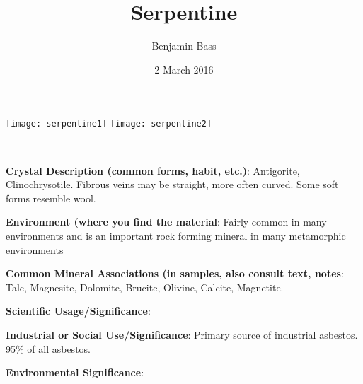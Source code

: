\documentclass[10pt]{article}
\author{Benjamin Bass}
\date{2 March 2016}
\title{\vspace{-2.0cm}Serpentine} %
\begin{document}
\maketitle


\begin{center}
  \texttt{[image: serpentine1]}
  \texttt{[image: serpentine2]}
\end{center}



\
\
\
\
\
\
\
\
\
\

\begin{framed}
  \textbf{Crystal Description (common forms, habit, etc.)}: Antigorite, Clinochrysotile. Fibrous veins may be straight, more often curved. Some soft forms resemble wool.
\end{framed}

\begin{framed}
  \textbf{Environment (where you find the material}: Fairly common in many environments and is an important rock forming mineral in many metamorphic environments
\end{framed}

\begin{framed}
  \textbf{Common Mineral Associations (in samples, also consult text, notes}: Talc, Magnesite, Dolomite, Brucite, Olivine, Calcite, Magnetite.
\end{framed}

\begin{framed}
  \textbf{Scientific Usage/Significance}: 
\end{framed}

\begin{framed}
  \textbf{Industrial or Social Use/Significance}: Primary source of industrial asbestos. 95\% of all asbestos.
\end{framed}

\begin{framed}
  \textbf{Environmental Significance}: 
\end{framed}

\end{document}
